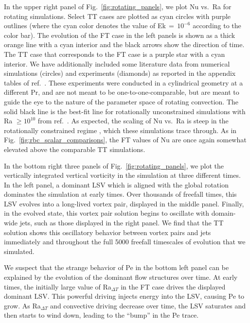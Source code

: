 \documentclass[aps, pre, onecolumn, nofootinbib, notitlepage, groupedaddress, amsfonts, amssymb, amsmath, longbibliography, superscriptaddress]{revtex4-1}
\begin{document}
In the upper right panel of Fig.~\ref{fig:rotating_panels}, we plot Nu vs.~Ra for rotating simulations.
Select TT cases are plotted as cyan circles with purple outlines (where the cyan color denotes the value of Ek$\,=\,10^{-6}$ according to the color bar).
The evolution of the FT case in the left panels is shown as a thick orange line with a cyan interior and the black arrows show the direction of time.
The TT case that corresponds to the FT case is a purple star with a cyan interior.
We have additionally included some literature data from numerical simulations (circles) and experiments (diamonds) as reported in the appendix tables of ref.~\cite{cheng&all2015}.
These experiments were conducted in a cylindrical geometry at a different Pr, and are not meant to be one-to-one-comparable, but are meant to guide the eye to the nature of the parameter space of rotating convection.
The solid black line is the best-fit line for rotationally unconstrained simulations with Ra $\geq 10^{10}$ from ref.~\cite{cheng&all2015}.
As expected, the scaling of Nu vs.~Ra is steep in the rotationally constrained regime \cite{julien&all2012, plumley&julien2019}, which these simulations trace through.
As in Fig.~\ref{fig:rbc_scalar_comparisons}, the FT values of Nu are once again somewhat elevated above the comparable TT simulations.

In the bottom right three panels of Fig.~\ref{fig:rotating_panels}, we plot the vertically integrated vertical vorticity in the simulation at three different times.
In the left panel, a dominant LSV which is aligned with the global rotation dominates the simulation at early times.
Over thousands of freefall times, this LSV evolves into a long-lived vortex pair, displayed in the middle panel.
Finally, in the evolved state, this vortex pair solution begins to oscillate with domain-wide jets, such as those displayed in the right panel.
We find that the TT solution shows this oscillatory behavior between vortex pairs and jets immediately and throughout the full 5000 freefall timescales of evolution that we simulated.

We suspect that the strange behavior of Pe in the bottom left panel can be explained by the evolution of the dominant flow structures over time.
At early times, the initially large value of Ra$_{\Delta T}$ in the FT case drives the displayed dominant LSV.
This powerful driving injects energy into the LSV, causing Pe to grow.
As Ra$_{\Delta T}$ and convective driving decrease over time, the LSV saturates and then starts to wind down, leading to the ``bump'' in the Pe trace.
\end{document}
